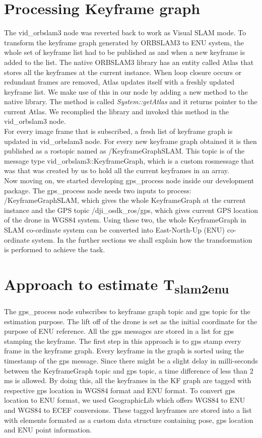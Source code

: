 \section{Processing Keyframe graph}
\label{sec:processingKFgraph}
The vid\_orbslam3 node was reverted back to work as Visual SLAM mode. To transform the keyframe graph generated by ORBSLAM3 to ENU system, the whole set of keyframe list had to be published as and when a new keyframe is added to the list. The native ORBSLAM3 library has an entity called Atlas that stores all the keyframes at the current instance. When loop closure occurs or redundant frames are removed, Atlas updates itself with a freshly updated keyframe list. We make use of this in our node by adding a new method to the native library. The method is called \emph{System::getAtlas} and it returns pointer to the current Atlas. We recomplied the library and invoked this method in the vid\_orbslam3 node.\\

For every image frame that is subscribed, a fresh list of keyframe graph is updated in vid\_orbslam3 node. For every new keyframe graph obtained it is then published as a rostopic named as /KeyframeGraphSLAM. This topic is of the message type vid\_orbslam3::KeyframeGraph, which is a custom rosmessage that was that was created by us to hold all the current keyframes in an array.\\

Now moving on, we started developing gps\_process node inside our development package. The gps\_process node needs two inputs to process: /KeyframeGraphSLAM, which gives the whole KeyframeGraph at the current instance and the GPS topic /dji\_osdk\_ros/gps, which gives current GPS location of the drone in WGS84 system. Using these two, the whole KeyframeGraph in SLAM co-ordinate system can be converted into East-North-Up (ENU) co-ordinate system. In the further sections we shall explain how the transformation is performed to achieve the task.

\section{Approach to estimate T\textsubscript{slam2enu}}
\label{sec:approachTslam2enu}
The gps\_process node subscribes to keyframe graph topic and gps topic for the estimation purpose. The lift off of the drone is set as the initial coordinate for the purpose of ENU reference. All the gps messages are stored in a list for gps stamping the keyframe. The first step in this approach is to gps stamp every frame in the keyframe graph. Every keyframe in the graph is sorted using the timestamp of the gps message. Since there might be a slight delay in milli-seconds between the KeyframeGraph topic and gps topic, a time difference of less than 2 ms is allowed. By doing this, all the keyframes in the KF graph are tagged with respective gps location in WGS84 format and ENU format. To convert gps location to ENU format, we used GeographicLib \cite{GeographicLib} which offers WGS84 to ENU and WGS84 to ECEF conversions. These tagged keyframes are stored into a list with elements formated as a custom data structure containing pose, gps location and ENU point information.\\


